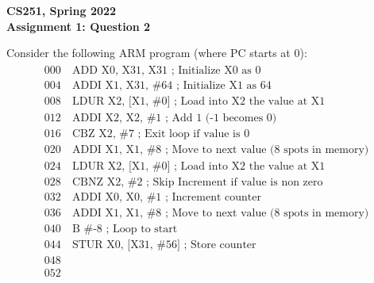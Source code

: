 \documentclass[12pt]{article}
\begin{document}
\begin{center}
{\Large\textbf{CS251, Spring 2022}}\\
\vspace{2mm}
{\Large\textbf{Assignment 1: Question 2}}\\
\vspace{3mm}
\end{center}
\begin{adjustwidth}{0em}{0pt}
Consider the following ARM program (where PC starts at 0):
\begin{align*}
    \begin{aligned}
       000& \ \text{ADD X0, X31, X31  \ \ ; Initialize X0 as 0} \\
       004& \ \text{ADDI X1, X31, \#64 \ ; Initialize X1 as 64} \\
       008& \ \text{LDUR X2, [X1, \#0] \ ; Load into X2 the value at X1} \\
       012& \ \text{ADDI X2, X2, \#1  \ \ \ \ ; Add 1 (-1 becomes 0)} \\
       016& \ \text{CBZ X2, \#7 \ \ \ \ \ \ \ \ \ \ \ \ ; Exit loop if value is 0} \\
       020& \ \text{ADDI X1, X1, \#8 \ \ \ \ \ ; Move to next value (8 spots in memory)} \\
       024& \ \text{LDUR X2, [X1, \#0] \ \ \ ; Load into X2 the value at X1} \\
       028& \ \text{CBNZ X2, \#2 \ \ \ \ \ \ \ \ \ \ ; Skip Increment if value is non zero} \\
       032& \ \text{ADDI X0, X0, \#1 \ \ \ \ \ ; Increment counter} \\
       036& \ \text{ADDI X1, X1, \#8 \ \ \ \ \ ; Move to next value (8 spots in memory)} \\
       040& \ \text{B \#-8 \ \ \ \ \ \ \ \ \ \ \ \ \ \ \ \ \ \ \ \ \  ; Loop to start} \\
       044& \ \text{STUR X0, [X31, \#56] \ ; Store counter} \\
       048& \ \\
       052& \  \\
    \end{aligned}
\end{align*}
\end{adjustwidth}
\end{document}
